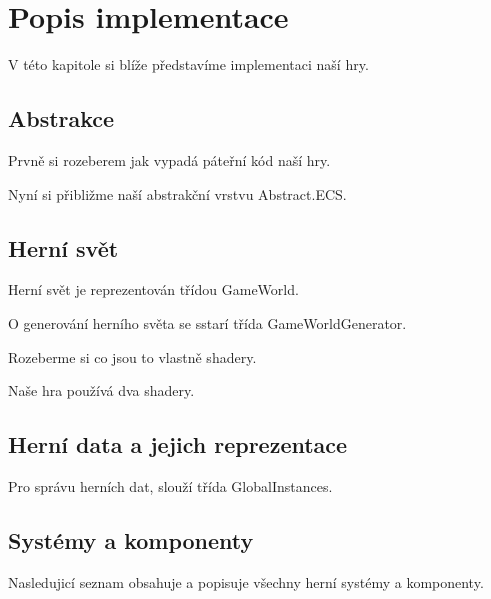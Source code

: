 \chapter{Popis implementace}
V této kapitole si blíže představíme implementaci naší hry.

\section{Abstrakce}
Prvně si rozeberem jak vypadá páteřní kód naší hry.


Nyní si přibližme naší abstrakční vrstvu Abstract.ECS.


\section{Herní svět}
Herní svět je reprezentován třídou GameWorld.

O generování herního světa se sstarí třída GameWorldGenerator.

Rozeberme si co jsou to vlastně shadery.

Naše hra používá dva shadery.


\section{Herní data a jejich reprezentace}

Pro správu herních dat, slouží třída GlobalInstances.



\section{Systémy a komponenty}

Nasledujicí seznam obsahuje a popisuje všechny herní systémy a komponenty.